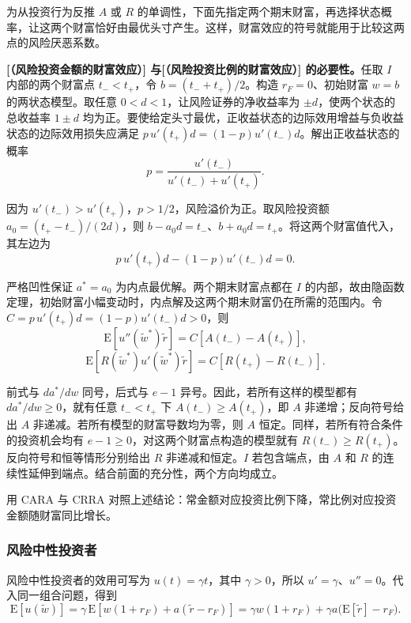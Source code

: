 为从投资行为反推 $A$ 或 $R$ 的单调性，下面先指定两个期末财富，再选择状态概率，让这两个财富恰好由最优头寸产生。这样，财富效应的符号就能用于比较这两点的风险厌恶系数。

\begin{solution}[label-content={证明},blank-type=none]
\textbf{[（风险投资金额的财富效应）] 与[（风险投资比例的财富效应）] 的必要性。}任取 $I$ 内部的两个财富点 $t_-<t_+$，令 $b=(t_-+t_+)/2$。构造 $r_F=0$、初始财富 $w=b$ 的两状态模型。取任意 $0<d<1$，让风险证券的净收益率为 $\pm d$，使两个状态的总收益率 $1\pm d$ 均为正。要使给定头寸最优，正收益状态的边际效用增益与负收益状态的边际效用损失应满足 $p\,u'(t_+)d=(1-p)u'(t_-)d$。解出正收益状态的概率
\[
 p=\frac{u'(t_-)}{u'(t_-)+u'(t_+)}.
\]

因为 $u'(t_-)>u'(t_+)$，$p>1/2$，风险溢价为正。取风险投资额 $a_0=(t_+-t_-)/(2d)$，则 $b-a_0d=t_-$、$b+a_0d=t_+$。将这两个财富值代入，其左边为
\[
 p\,u'(t_+)d-(1-p)u'(t_-)d=0.
\]

严格凹性保证 $a^*=a_0$ 为内点最优解。两个期末财富点都在 $I$ 的内部，故由隐函数定理，初始财富小幅变动时，内点解及这两个期末财富仍在所需的范围内。令 $C=p\,u'(t_+)d=(1-p)u'(t_-)d>0$，则
\[
 \mathrm E[u''(\tilde w^*)\tilde r]
 =C[A(t_-)-A(t_+)],
\]
\[
 \mathrm E[R(\tilde w^*)u'(\tilde w^*)\tilde r]
 =C[R(t_+)-R(t_-)].
\]

前式与 $da^*/dw$ 同号，后式与 $e-1$ 异号。因此，若所有这样的模型都有 $da^*/dw\ge0$，就有任意 $t_-<t_+$ 下 $A(t_-)\ge A(t_+)$，即 $A$ 非递增；反向符号给出 $A$ 非递减。若所有模型的财富导数均为零，则 $A$ 恒定。同样，若所有符合条件的投资机会均有 $e-1\ge0$，对这两个财富点构造的模型就有 $R(t_-)\ge R(t_+)$。反向符号和恒等情形分别给出 $R$ 非递减和恒定。$I$ 若包含端点，由 $A$ 和 $R$ 的连续性延伸到端点。结合前面的充分性，两个方向均成立。
\end{solution}

 用 CARA 与 CRRA 对照上述结论：常金额对应投资比例下降，常比例对应投资金额随财富同比增长。


\subsubsection{风险中性投资者}
风险中性投资者的效用可写为 $u(t)=\gamma t$，其中 $\gamma>0$，所以 $u'=\gamma$、$u''=0$。代入同一组合问题，得到
\[
 \mathrm E[u(\tilde w)]
 =\gamma\,\mathrm E[w(1+r_F)+a(\tilde r-r_F)]
 =\gamma w(1+r_F)+\gamma a\bigl(\mathrm E[\tilde r]-r_F\bigr).
\]

